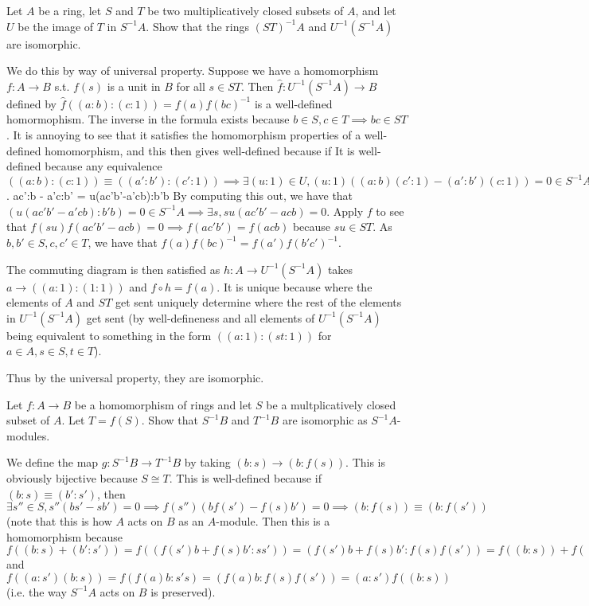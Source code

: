 \begin{questions}
\question Let $A$ be a ring, let $S$ and $T$ be two multiplicatively closed subsets of $A $, and let $U$ be the image of $T$ in $S^{-1}A$. Show that the rings $(ST)^{-1}A$ and $U^{-1}(S^{-1}A)$ are isomorphic.
\begin{solution}
	We do this by way of universal property.
	Suppose we have a homomorphism $f:A \to B$ s.t. $f(s)$ is a unit in $B$ for all $s \in ST$.
	Then $\hat{f}: U^{-1}(S^{-1}A) \to B$ defined by $\hat{f}((a:b):(c:1)) = f(a)f(bc)^{-1}$ is a well-defined homormophism.
	The inverse in the formula exists because $b\in S, c\in T \implies bc \in ST$.
	It is annoying to see that it satisfies the homomorphism properties of a well-defined homomorphism, and this then gives well-defined because if
	It is well-defined because any equivalence $((a:b):(c:1)) \equiv ((a':b'):(c':1)) \implies \exists (u:1)\in U, (u:1)((a:b)(c':1)-(a':b')(c:1)) = 0 \in S^{-1}A$.
	ac':b - a'c:b' = u(ac'b'-a'cb):b'b
	By computing this out, we have that $(u(ac'b'-a'cb):b'b) =0 \in S^{-1}A \implies \exists s, su(ac'b'-ac b) = 0$.
	Apply $f$ to see that $f(su)f(ac'b'-ac b) = 0 \implies f(ac'b') = f(ac b)$ because $su \in ST$.
	As $b,b'\in S,c,c'\in T $, we have that $f(a)f(bc)^{-1} = f(a')f(b'c')^{-1}$.

	The commuting diagram is then satisfied as $h: A\to U^{-1}(S^{-1}A)$ takes $a \to ((a:1):(1:1))$ and $f\circ h = f(a)$.
	It is unique because where the elements of $A$ and $ST$ get sent uniquely determine where the rest of the elements in $U^{-1}(S^{-1}A)$ get sent (by well-defineness and all elements of $U^{-1}(S^{-1}A)$ being equivalent to something in the form $((a:1):(st:1))$ for $a\in A, s\in S, t\in T $).

	Thus by the universal property, they are isomorphic.
\end{solution}

\question Let $f: A\to B$ be a homomorphism of rings and let $S$ be a multplicatively closed subset of $A$. Let $T = f(S)$. Show that $S^{-1}B$ and $T^{-1}B$ are isomorphic as $S^{-1}A$-modules.
\begin{solution}
	We define the map $g: S^{-1}B\to T^{-1}B$ by taking $(b:s) \to (b:f(s))$.
	This is obviously bijective because $S\cong T$.
	This is well-defined because if $(b:s) \equiv (b':s') $, then $\exists s''\in S, s''(bs'-sb') = 0 \implies f(s'')(bf(s')-f(s)b') = 0\implies (b:f(s)) \equiv (b:f(s'))$ (note that this is how $A$ acts on $B$ as an $A$-module.
	Then this is a homomorphism because $f((b:s)+(b':s')) = f((f(s')b+f(s)b':ss')) = (f(s')b+f(s)b':f(s)f(s')) = f((b:s)) + f((b':s'))$ and $f((a:s')(b:s)) = f(f(a)b:s's) = (f(a)b:f(s)f(s')) = (a:s')f((b:s)) $ (i.e. the way $S^{-1}A $ acts on $B $ is preserved).


\end{solution}
\end{questions}
